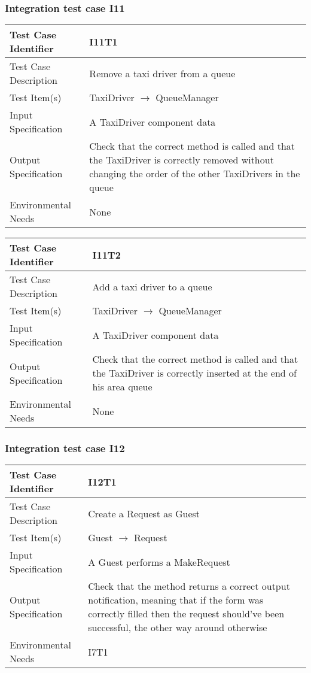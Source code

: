 		\subsubsection{Integration test case I11}
		\begin{center}
			\begin{tabular}{ |l p{10cm}| } \hline
				Test Case Identifier & I11T1 \\ \hline
				Test Case Description & Remove a taxi driver from a queue \\ \hline
				Test Item(s) & TaxiDriver $\rightarrow$ QueueManager \\ \hline
				Input Specification & A TaxiDriver component data \\ \hline
				Output Specification & Check that the correct method is called and that the TaxiDriver is
				correctly removed without changing the order of the other TaxiDrivers in the queue \\ \hline
				Environmental Needs & None \\ \hline
			\end{tabular}
			\begin{tabular}{ |l p{10cm}| } \hline
				Test Case Identifier & I11T2 \\ \hline
				Test Case Description & Add a taxi driver to a queue \\ \hline
				Test Item(s) & TaxiDriver $\rightarrow$ QueueManager \\ \hline
				Input Specification & A TaxiDriver component data \\ \hline
				Output Specification & Check that the correct method is called and that the TaxiDriver is
				correctly inserted at the end of his area queue \\ \hline
				Environmental Needs & None \\ \hline
			\end{tabular}
		\end{center}
		\subsubsection{Integration test case I12}
		\begin{center}
			\begin{tabular}{ |l p{10cm}| } \hline
				Test Case Identifier & I12T1 \\ \hline
				Test Case Description & Create a Request as Guest \\ \hline
				Test Item(s) & Guest $\rightarrow$ Request \\ \hline
				Input Specification & A Guest performs a MakeRequest\\ \hline
				Output Specification & Check that the method returns a correct output notification, meaning that if the form was correctly filled then
				the request should've been successful, the other way around otherwise \\ \hline
				Environmental Needs & I7T1 \\ \hline
			\end{tabular}
		\end{center}
